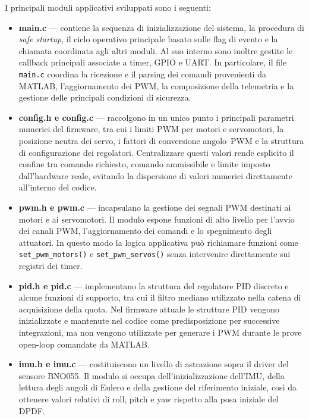 \documentclass[11pt]{report}
\begin{document}
I principali moduli applicativi sviluppati sono i seguenti:
\begin{itemize}
    \item \textbf{main.c} — contiene la sequenza di inizializzazione del sistema, la procedura di \textit{safe startup}, il ciclo operativo principale basato sulle flag di evento e la chiamata coordinata agli altri moduli. Al suo interno sono inoltre gestite le callback principali associate a timer, GPIO e UART. In particolare, il file \texttt{main.c} coordina la ricezione e il parsing dei comandi provenienti da MATLAB, l'aggiornamento dei PWM, la composizione della telemetria e la gestione delle principali condizioni di sicurezza.

    \item \textbf{config.h e config.c} — raccolgono in un unico punto i principali parametri numerici del firmware, tra cui i limiti PWM per motori e servomotori, la posizione neutra dei servo, i fattori di conversione angolo–PWM e la struttura di configurazione dei regolatori. Centralizzare questi valori rende esplicito il confine tra comando richiesto, comando ammissibile e limite imposto dall'hardware reale, evitando la dispersione di valori numerici direttamente all'interno del codice.

    \item \textbf{pwm.h e pwm.c} — incapsulano la gestione dei segnali PWM destinati ai motori e ai servomotori. Il modulo espone funzioni di alto livello per l'avvio dei canali PWM, l'aggiornamento dei comandi e lo spegnimento degli attuatori. In questo modo la logica applicativa può richiamare funzioni come \texttt{set\_pwm\_motors()} e \texttt{set\_pwm\_servos()} senza intervenire direttamente sui registri dei timer.

    \item \textbf{pid.h e pid.c} — implementano la struttura del regolatore PID discreto e alcune funzioni di supporto, tra cui il filtro mediano utilizzato nella catena di acquisizione della quota. Nel firmware attuale le strutture PID vengono inizializzate e mantenute nel codice come predisposizione per successive integrazioni, ma non vengono utilizzate per generare i PWM durante le prove open-loop comandate da MATLAB.

    \item \textbf{imu.h e imu.c} — costituiscono un livello di astrazione sopra il driver del sensore BNO055. Il modulo si occupa dell'inizializzazione dell'IMU, della lettura degli angoli di Eulero e della gestione del riferimento iniziale, così da ottenere valori relativi di roll, pitch e yaw rispetto alla posa iniziale del DPDF.


\end{itemize}
\end{document}
